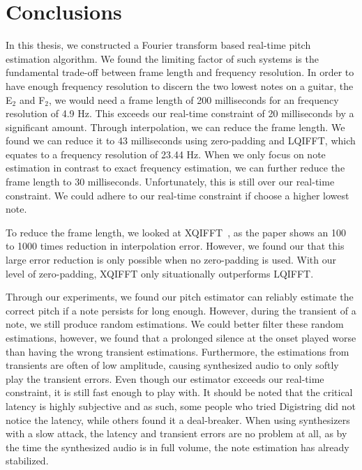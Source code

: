 \documentclass[a4paper,10pt,twocolumn]{article}
\newcommand{\note}[2]{#1${}_{#2}$}
\begin{document}
\section{Conclusions}
In this thesis, we constructed a Fourier transform based real-time pitch estimation algorithm. We found the limiting factor of such systems is the fundamental trade-off between frame length and frequency resolution. In order to have enough frequency resolution to discern the two lowest notes on a guitar, the \note{E}{2} and \note{F}{2}, we would need a frame length of 200 milliseconds for an frequency resolution of 4.9 Hz. This exceeds our real-time constraint of 20 milliseconds by a significant amount. Through interpolation, we can reduce the frame length. We found we can reduce it to 43 milliseconds using zero-padding and LQIFFT, which equates to a frequency resolution of 23.44 Hz. When we only focus on note estimation in contrast to exact frequency estimation, we can further reduce the frame length to 30 milliseconds. Unfortunately, this is still over our real-time constraint. We could adhere to our real-time constraint if choose a higher lowest note.

To reduce the frame length, we looked at XQIFFT~\cite{interpolnozero}, as the paper shows an 100 to 1000 times reduction in interpolation error. However, we found our that this large error reduction is only possible when no zero-padding is used. With our level of zero-padding, XQIFFT only situationally outperforms LQIFFT.


Through our experiments, we found our pitch estimator can reliably estimate the correct pitch if a note persists for long enough. However, during the transient of a note, we still produce random estimations. We could better filter these random estimations, however, we found that a prolonged silence at the onset played worse than having the wrong transient estimations. Furthermore, the estimations from transients are often of low amplitude, causing synthesized audio to only softly play the transient errors. Even though our estimator exceeds our real-time constraint, it is still fast enough to play with. It should be noted that the critical latency is highly subjective and as such, some people who tried Digistring did not notice the latency, while others found it a deal-breaker. When using synthesizers with a slow attack, the latency and transient errors are no problem at all, as by the time the synthesized audio is in full volume, the note estimation has already stabilized.
\end{document}
